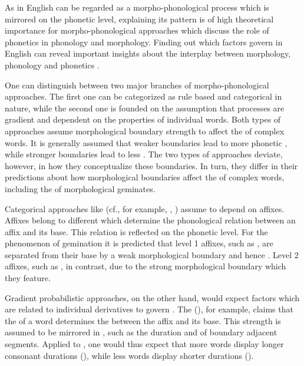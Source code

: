 As  in English  can be regarded as a morpho-phonological process which is mirrored on the phonetic level, explaining its pattern is of high theoretical importance for morpho-phonological approaches which discuss the role of phonetics in phonology and morphology. Finding out which factors govern  in English  can reveal important insights about  the interplay between morphology, phonology and phonetics .

One can distinguish between two major branches of morpho-phonological approaches. The first one can be categorized as rule based and  categorical in nature, while the second one is founded on the assumption that processes are gradient and dependent on the properties of individual words. 
Both types of approaches assume  morphological boundary strength to affect the  of complex words. 
It is generally assumed that weaker boundaries lead to more phonetic , while stronger boundaries lead to less . 
The two types of approaches deviate, however, in how they conceptualize these boundaries. In turn, they differ in their predictions about how morphological boundaries affect the  of complex words, including the  of morphological geminates.
 

Categorical approaches like  (cf., for example, \citealt{Kiparsky.1982}, \citealt{Mohanan.1986}) assume  to depend on affixes. Affixes belong to different  which determine the phonological relation between an affix and its base. This relation is reflected on the phonetic level. 
For the phenomenon of {gemination} it is predicted that level 1 affixes, such as , are separated from their base by a weak morphological boundary and hence . Level 2 affixes, such as , in contrast,  due to the strong morphological boundary which they feature. 

Gradient probabilistic approaches, on the other hand, would expect factors which are related to individual derivatives to govern . The  (\citealt{Hay.2003}), for example, claims that the  of a word determines the  between the affix and its base. This strength is assumed to be mirrored in , such as the duration and  of boundary adjacent segments. Applied to , one would thus expect that more  words display longer consonant durations (), while less  words display shorter durations (). 


